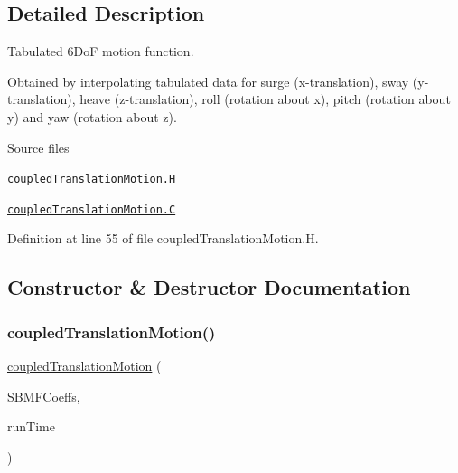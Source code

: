 \subsection{Detailed Description}
Tabulated 6\+DoF motion function. 

\label{_Description}%
 Obtained by interpolating tabulated data for surge (x-\/translation), sway (y-\/translation), heave (z-\/translation), roll (rotation about x), pitch (rotation about y) and yaw (rotation about z).

\begin{DoxyParagraph}{Source files}

\begin{DoxyItemize}
\item \href{../../../home/carlo/data/GeN-Foam/GeN-Foam_ffn/GeN-Foam/GeN-Foam/FMU4FOAM/ECI4FOAM/src/externalComm/externalIO/input/meshMotion/coupledTranslationMotion/coupledTranslationMotion.H}{\tt coupled\+Translation\+Motion.\+H} 
\item \href{../../../home/carlo/data/GeN-Foam/GeN-Foam_ffn/GeN-Foam/GeN-Foam/FMU4FOAM/ECI4FOAM/src/externalComm/externalIO/input/meshMotion/coupledTranslationMotion/coupledTranslationMotion.C}{\tt coupled\+Translation\+Motion.\+C} 
\end{DoxyItemize}
\end{DoxyParagraph}


Definition at line 55 of file coupled\+Translation\+Motion.\+H.



\subsection{Constructor \& Destructor Documentation}
\mbox{\label{classFoam_1_1solidBodyMotionFunctions_1_1coupledTranslationMotion_a50d6d4c6db4c9f828965a1fef3c5ac3c}} 
\subsubsection{\texorpdfstring{coupled\+Translation\+Motion()}{coupledTranslationMotion()}}
{\footnotesize\ttfamily \hyperlink{classFoam_1_1solidBodyMotionFunctions_1_1coupledTranslationMotion}{coupled\+Translation\+Motion} (\begin{DoxyParamCaption}\item[{const dictionary \&}]{S\+B\+M\+F\+Coeffs,  }\item[{const Time \&}]{run\+Time }\end{DoxyParamCaption})}



